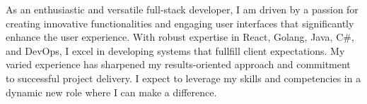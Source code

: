 As an enthusiastic and versatile full-stack developer, I am driven by a passion for creating innovative functionalities 
and engaging user interfaces that significantly enhance the user experience.
With robust expertise in React, Golang, Java, C\#, and DevOps, I excel in developing systems that fullfill client expectations. 
My varied experience has sharpened my results-oriented approach and commitment to successful project delivery.
I expect to leverage my skills and competencies in a dynamic new role where I can make a difference.

